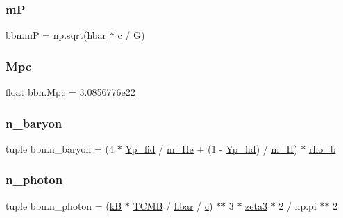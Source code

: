 \subsubsection{\texorpdfstring{mP}{mP}}
{\footnotesize\ttfamily bbn.\+mP = np.\+sqrt(\mbox{\hyperlink{namespacebbn_aa4b15a6720cfbfaebb9a8ba90c2d6615}{hbar}} $\ast$ \mbox{\hyperlink{namespacebbn_ac2a771643cfcc5258e2d0a8d61096152}{c}} / \mbox{\hyperlink{namespacebbn_a52f93a6b9a98bb4b459145af6e1c0ffd}{G}})}

\mbox{\label{namespacebbn_a2c0a557eeaca292987c3ee7da6384295}} 
\subsubsection{\texorpdfstring{Mpc}{Mpc}}
{\footnotesize\ttfamily float bbn.\+Mpc = 3.\+0856776e22}

\mbox{\label{namespacebbn_a08ca9283eb4fca8cde9e83fc5a201313}} 
\subsubsection{\texorpdfstring{n\+\_\+baryon}{n\_baryon}}
{\footnotesize\ttfamily tuple bbn.\+n\+\_\+baryon = (4 $\ast$ \mbox{\hyperlink{namespacebbn_a8b00dee4a160e555ce5c5b347787d15e}{Yp\+\_\+fid}} / \mbox{\hyperlink{namespacebbn_a5659e9c09b2847f14bb66c2d73e68191}{m\+\_\+\+He}} + (1 -\/ \mbox{\hyperlink{namespacebbn_a8b00dee4a160e555ce5c5b347787d15e}{Yp\+\_\+fid}}) / \mbox{\hyperlink{namespacebbn_af144f84053152a233d6f7fe2f505589f}{m\+\_\+H}}) $\ast$ \mbox{\hyperlink{namespacebbn_a6a197e513271f0796a8a4e5e2846b34d}{rho\+\_\+b}}}

\mbox{\label{namespacebbn_afb075d5c6ea4d70b7b6b502224ffbac9}} 
\subsubsection{\texorpdfstring{n\+\_\+photon}{n\_photon}}
{\footnotesize\ttfamily tuple bbn.\+n\+\_\+photon = (\mbox{\hyperlink{namespacebbn_ad8b80a31c3103c575ee91606b28c00b6}{kB}} $\ast$ \mbox{\hyperlink{namespacebbn_a45c7b6e0cda690af956e72f58b332e66}{T\+C\+MB}} / \mbox{\hyperlink{namespacebbn_aa4b15a6720cfbfaebb9a8ba90c2d6615}{hbar}} / \mbox{\hyperlink{namespacebbn_ac2a771643cfcc5258e2d0a8d61096152}{c}}) $\ast$$\ast$ 3 $\ast$ \mbox{\hyperlink{namespacebbn_a43d9d2d8599e22e361b96747ee7210fe}{zeta3}} $\ast$ 2 / np.\+pi $\ast$$\ast$ 2}

